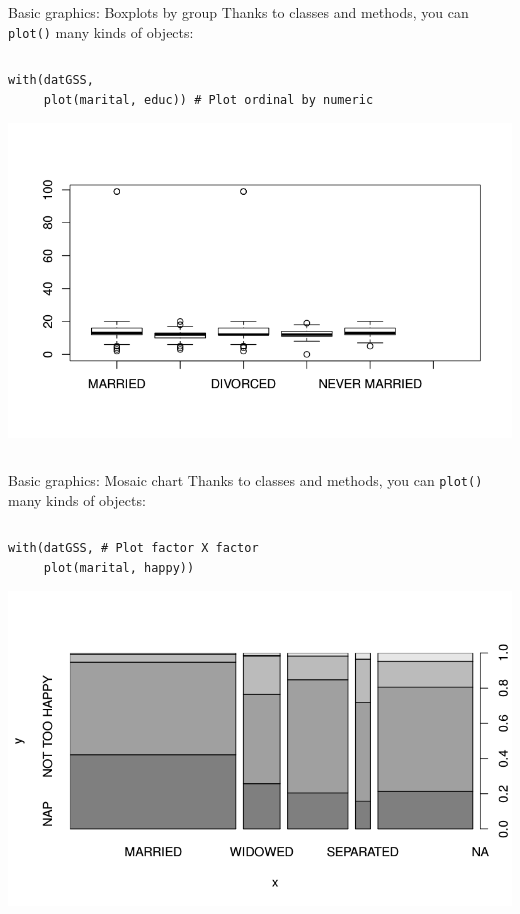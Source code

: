 \documentclass[table,smaller]{beamer}
\begin{document}
\begin{frame}[fragile,label=sec-7-8]{Basic graphics: Boxplots by group}
 Thanks to classes and methods, you can \verb~plot()~ many kinds of objects:
\begin{columns}  \begin{block}{}
\begin{verbatim}
with(datGSS,
     plot(marital, educ)) # Plot ordinal by numeric
\end{verbatim}
\includegraphics[width=.9\textwidth]{images/examplePlot2.png}
\end{block} \end{columns}
\end{frame}

\begin{frame}[fragile,label=sec-7-9]{Basic graphics: Mosaic chart}
 Thanks to classes and methods, you can \verb~plot()~ many kinds of objects:
\begin{columns}  \begin{block}{}
\begin{verbatim}
with(datGSS, # Plot factor X factor
     plot(marital, happy))
\end{verbatim}
\includegraphics[width=.95\textwidth]{images/examplePlot3.png}

\end{block} \end{columns}
\end{frame}
\end{document}
